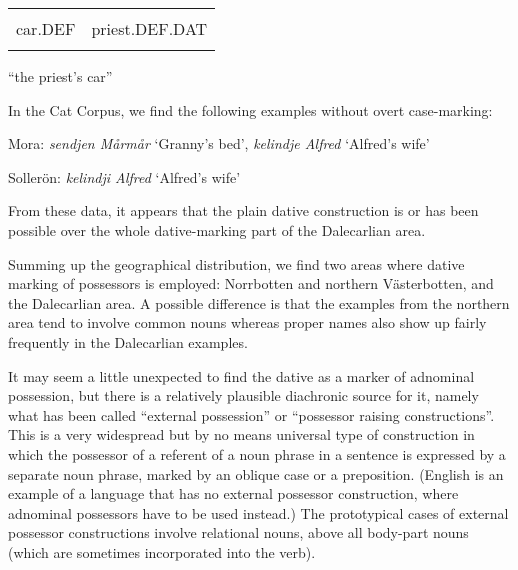 \begin{tabular}{ll}
\lsptoprule
\multicolumn{2}{l}{biln

}\\
car.DEF & priest.DEF.DAT\\
\lspbottomrule
\end{tabular}

\begin{styleTranslation}
“the priest’s car”

\end{styleTranslation}

In the Cat Corpus, we find the following examples without overt case-marking:

\begin{listWWNumileveli}
\item 

\end{listWWNumileveli}

\begin{styleListiii}
Mora: \textit{sendjen Mårmår} ‘Granny’s bed’, \textit{kelindje Alfred }‘Alfred’s wife’

\end{styleListiii}

\begin{styleListiii}
Sollerön: \textit{kelindji Alfred} ‘Alfred’s wife’

\end{styleListiii}

\begin{styleBodyTextFirst}
From these data, it appears that the plain dative construction is or has been possible over the whole dative-marking part of the Dalecarlian area. 

\end{styleBodyTextFirst}

\begin{styleBodytextC}
Summing up the geographical distribution, we find two areas where dative marking of possessors is employed: Norrbotten and northern Västerbotten, and the Dalecarlian area. A possible difference is that the examples from the northern area tend to involve common nouns whereas proper names also show up fairly frequently in the Dalecarlian examples. 

\end{styleBodytextC}

\begin{styleBodytextC}
It may seem a little unexpected to find the dative as a marker of adnominal possession, but there is a relatively plausible diachronic source for it, namely what has been called “external possession” or “possessor raising constructions”. This is a very widespread but by no means universal type of construction in which the possessor of a referent of a noun phrase in a sentence is expressed by a separate noun phrase, marked by an oblique case or a preposition. (English is an example of a language that has no external possessor construction, where adnominal possessors have to be used instead.) The prototypical cases of external possessor constructions involve relational nouns, above all body-part nouns (which are sometimes incorporated into the verb).

\end{styleBodytextC}

